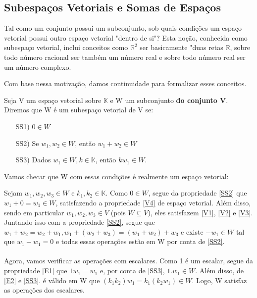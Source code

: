 \subsection{Subespa\c cos Vetoriais e Somas de Espa\c cos}
Tal como um conjunto possui um subconjunto, sob quais condi\c c\~oes um espa\c co vetorial possui
outro espa\c co vetorial "dentro de si"? Esta no\c c\~ao, conhecida como subespa\c co vetorial,
inclui conceitos como $\mathbb{R}^2$ ser basicamente "duas retas $\mathbb{R}$, sobre todo n\'umero
racional ser tamb\'em um n\'umero real e sobre todo n\'umero real ser um n\'umero complexo.

Com base nessa motiva\c c\~ao, damos continuidade para formalizar esses conceitos.

\begin{def*}
    Seja V um espa\c co vetorial sobre $\mathbb{K}$ e W um subconjunto \textbf{do conjunto V}. 
    Diremos que W \'e um subespa\c co vetorial de V se:
    \begin{itemize}
        \item [SS1)] $0\in{W}$ \label{SS1}
        \item [SS2)] Se $w_1, w_2\in{W}$, ent\~ao $w_1 + w_2 \in{W}$ \label{SS2}
        \item [SS3)] Dados $w_1 \in{W}, k\in\mathbb{K}$, ent\~ao $kw_1 \in{W}.$ \label{SS3}
    \end{itemize}
\end{def*}

Vamos checar que W com essas condi\c c\~oes \'e realmente um espa\c co vetorial:

Sejam $w_1, w_2, w_3\in{W}$ e $k_1, k_2\in\mathbb{K}$. Como $0\in{W}$, segue da propriedade \ref{SS2} 
que $w_1 + 0 = w_1 \in{W}$, satisfazendo a propriedade \ref{V4} de espa\c co vetorial. Al\'em disso, sendo
em particular $w_1, w_2, w_3\in{V}$ (pois $W\subseteq{V}$), eles satisfazem \ref{V1}, \ref{V2} e \ref{V3}.
Juntando isso com a propriedade \ref{SS2}, segue que $w_1 + w_2 = w_2 + w_1, w_1 + (w_2 + w_3) = (w_1 + w_2) + w_3$ e
existe $-w_1\in{W}$ tal que $w_1 - w_1 = 0$ e todas essas opera\c c\~oes est\~ao em W por conta de \ref{SS2}.
\paragraph*{} Agora, vamos verificar as opera\c c\~oes com escalares. Como 1 \'e um escalar, segue
da propriedade \ref{E1} que $1w_1 = w_1$ e, por conta de \ref{SS3}, $1.w_1\in{W}.$ Al\'em disso,
de \ref{E2} e \ref{SS3}. \'e v\'alido em W que $(k_1k_2)w_1 = k_1(k_2w_1)\in{W}.$ Logo, W
satisfaz as opera\c c\~oes dos escalares.
